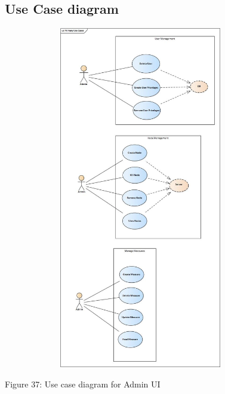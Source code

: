 \subsection{Use Case diagram}
    \includegraphics[width=12cm,height=15cm,keepaspectratio]{admin_ui/images/Primary_Use_Cases.png}
    \begin{center}
    	\small{Figure 37: Use case diagram for Admin UI}
    \end{center}
